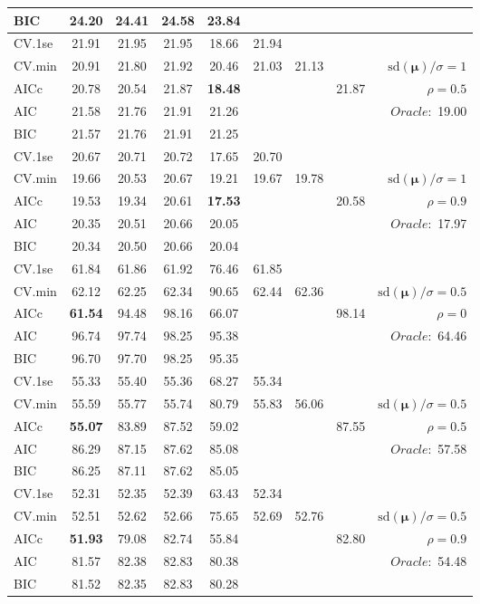 \begin{table}
\begin{center}
\begin{tabular}{l*{7}{c}|r}
BIC & 24.20 & 24.41 & 24.58 & 23.84 & & & &  \\
 \hline 
CV.1se & 21.91 & 21.95 & 21.95 & 18.66 & 21.94 & & & \\
CV.min & 20.91 & 21.80 & 21.92 & 20.46 & 21.03 & 21.13 & & $\mathrm{sd}(\mathbf{\mu})/\sigma=1$ \\
AICc & 20.78 & 20.54 & 21.87 & {\bf 18.48} & & & 21.87 &  $\rho=0.5$ \\
AIC & 21.58 & 21.76 & 21.91 & 21.26 & & & &  \multirow{2}{*}{$Oracle: $ 19.00} \\
BIC & 21.57 & 21.76 & 21.91 & 21.25 & & & &  \\
 \hline 
CV.1se & 20.67 & 20.71 & 20.72 & 17.65 & 20.70 & & & \\
CV.min & 19.66 & 20.53 & 20.67 & 19.21 & 19.67 & 19.78 & & $\mathrm{sd}(\mathbf{\mu})/\sigma=1$ \\
AICc & 19.53 & 19.34 & 20.61 & {\bf 17.53} & & & 20.58 &  $\rho=0.9$ \\
AIC & 20.35 & 20.51 & 20.66 & 20.05 & & & &  \multirow{2}{*}{$Oracle: $ 17.97} \\
BIC & 20.34 & 20.50 & 20.66 & 20.04 & & & &  \\
 \hline 
CV.1se & 61.84 & 61.86 & 61.92 & 76.46 & 61.85 & & & \\
CV.min & 62.12 & 62.25 & 62.34 & 90.65 & 62.44 & 62.36 & & $\mathrm{sd}(\mathbf{\mu})/\sigma=0.5$ \\
AICc & {\bf 61.54} & 94.48 & 98.16 & 66.07 & & & 98.14 &  $\rho=0$ \\
AIC & 96.74 & 97.74 & 98.25 & 95.38 & & & &  \multirow{2}{*}{$Oracle: $ 64.46} \\
BIC & 96.70 & 97.70 & 98.25 & 95.35 & & & &  \\
 \hline 
CV.1se & 55.33 & 55.40 & 55.36 & 68.27 & 55.34 & & & \\
CV.min & 55.59 & 55.77 & 55.74 & 80.79 & 55.83 & 56.06 & & $\mathrm{sd}(\mathbf{\mu})/\sigma=0.5$ \\
AICc & {\bf 55.07} & 83.89 & 87.52 & 59.02 & & & 87.55 &  $\rho=0.5$ \\
AIC & 86.29 & 87.15 & 87.62 & 85.08 & & & &  \multirow{2}{*}{$Oracle: $ 57.58} \\
BIC & 86.25 & 87.11 & 87.62 & 85.05 & & & &  \\
 \hline 
CV.1se & 52.31 & 52.35 & 52.39 & 63.43 & 52.34 & & & \\
CV.min & 52.51 & 52.62 & 52.66 & 75.65 & 52.69 & 52.76 & & $\mathrm{sd}(\mathbf{\mu})/\sigma=0.5$ \\
AICc & {\bf 51.93} & 79.08 & 82.74 & 55.84 & & & 82.80 &  $\rho=0.9$ \\
AIC & 81.57 & 82.38 & 82.83 & 80.38 & & & &  \multirow{2}{*}{$Oracle: $ 54.48} \\
BIC & 81.52 & 82.35 & 82.83 & 80.28 & & & &  \\
 \hline 
\end{tabular}
\end{center}
\vspace{-1cm}
\end{table}





